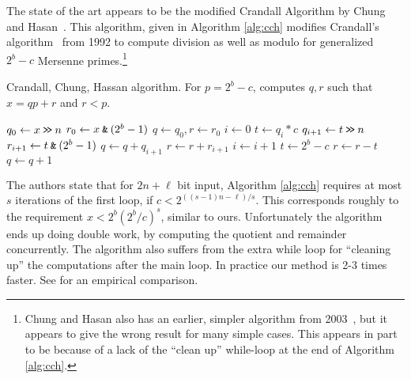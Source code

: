 The state of the art appears to be the modified Crandall Algorithm by Chung and Hasan~\cite{chung2006low}.
This algorithm, given in Algorithm \ref{alg:cch} modifies Crandall's algorithm~\cite{crandall1992method} from 1992 to compute division as well as modulo for generalized $2^b-c$ Mersenne primes.\footnote{
   Chung and Hasan also has an earlier, simpler algorithm from 2003~\cite{chung2003more},
   but it appears to give the wrong result for many simple cases.
   This appears in part to be because of a lack of the ``clean up'' while-loop at the end of Algorithm \ref{alg:cch}.
}
\begin{algorithm}[H]
   \caption{Crandall, Chung, Hassan algorithm. For $p=2^b-c$, computes $q, r$ such that $x = qp+r$ and $r<p$.}
   \label{alg:cch}
   \begin{algorithmic}
         \State $q_0 \gets x \mathbin{\texttt{>\!>}} n$
         \State $r_0 \gets x \mathbin{\texttt{\&}} (2^b-1)$
         \State $q \gets q_0, r\gets r_0$
         \State $i \gets 0$
            \State $t \gets q_i*c$
            \State $q_{i+1} \gets t \mathbin{\texttt{>\!>}} n$
            \State $r_{i+1} \gets t \mathbin{\texttt{\&}} (2^b - 1)$
            \State $q\gets q+q_{i+1}$
            \State $r\gets r+r_{i+1}$
            \State $i\gets i+1$
         \EndWhile
         \State $t \gets 2^b-c$
            \State $r\gets r-t$
            \State $q\gets q+1$
         \EndWhile
   \end{algorithmic}
\end{algorithm}
The authors state that for $2n+\ell$ bit input, Algorithm \ref{alg:cch}
requires at most $s$ iterations of the first loop, if $c < 2^{((s-1)n-\ell)/s}$.
This corresponds roughly to the requirement $x < 2^b (2^b/c)^s$, similar to ours.
%
Unfortunately the algorithm ends up doing double work, by computing the quotient and remainder concurrently.
The algorithm also suffers from the extra while loop for ``cleaning up'' the computations after the main loop.
In practice our method is 2-3 times faster. See  for an empirical comparison.
%




